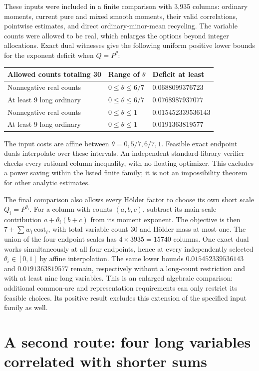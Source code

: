 \documentclass[11pt,letterpaper]{article}
\theoremstyle{remark}
\newcommand{\ConeGapShort}{0.0688099376723}
\newcommand{\ConeGapShortNine}{0.0768987937077}
\newcommand{\ConeGapAll}{0.015452339536143}
\newcommand{\ConeGapAllNine}{0.0191363819577}
\begin{document}
These inputs were included in a finite comparison with 3,935 columns:
ordinary moments, current pure and mixed smooth moments, their valid correlations,
pointwise estimates, and direct ordinary-minor-mean recycling. The variable counts
were allowed to be real, which enlarges the options beyond integer allocations.
Exact dual witnesses give the following uniform positive lower bounds for the
exponent deficit when $Q=P^\theta$:
\begin{center}
\begin{tabular}{lll}
\toprule
Allowed counts totaling 30 & Range of $\theta$ & Deficit at least\\
\midrule
Nonnegative real counts & $0\le\theta\le6/7$ & $\ConeGapShort$\\
At least 9 long ordinary & $0\le\theta\le6/7$ & $\ConeGapShortNine$\\
Nonnegative real counts & $0\le\theta\le1$ & $\ConeGapAll$\\
At least 9 long ordinary & $0\le\theta\le1$ & $\ConeGapAllNine$\\
\bottomrule
\end{tabular}
\end{center}
The input costs are affine between $\theta=0,5/7,6/7,1$.
Feasible exact endpoint duals interpolate over these intervals. An independent
standard-library verifier checks every rational column inequality, with no
floating optimizer. This excludes a power saving within the listed finite family;
it is not an impossibility theorem for other analytic estimates.

The final comparison also allows every H\"older factor to choose its own short
scale $Q_i=P^{\theta_i}$. For a column with counts $(a,b,c)$, subtract its main-scale
contribution $a+\theta_i(b+c)$ from its moment exponent. The objective is then
$7+\sum w_i\,\mathrm{cost}_i$, with total variable count 30 and H\"older mass at
most one. The union of the four endpoint scales has $4\times3935=15740$ columns.
One exact dual works simultaneously at all four endpoints, hence at every
independently selected $\theta_i\in[0,1]$ by affine interpolation. The same lower
bounds $\ConeGapAll$ and $\ConeGapAllNine$ remain, respectively without a long-count
restriction and with at least nine long variables. This is an enlarged algebraic
comparison: additional common-arc and representation requirements can only restrict
its feasible choices. Its positive result excludes this extension of the specified
input family as well.

\section{A second route: four long variables correlated with shorter sums}\label{sec:weighted}
\end{document}
